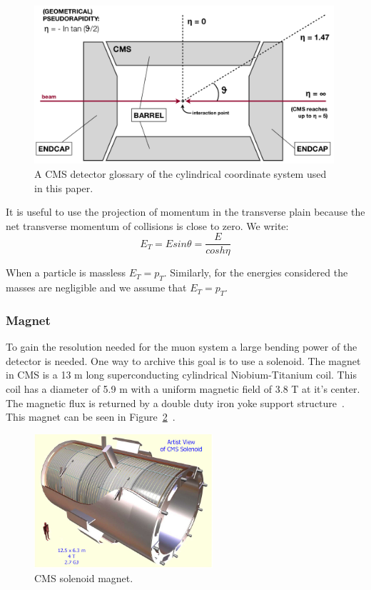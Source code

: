 \begin{figure}[htb]
\centering
\includegraphics[width=0.99\textwidth]{Experiment/DetectorGlossary.png}
\caption{A CMS detector glossary of the cylindrical coordinate system used in this paper.~\cite{Pandolfi_talk}}
\label{fig:CMS_detector_glossary}
\end{figure}

It is useful to use the projection of momentum in the transverse plain because the net transverse momentum of collisions is close to zero.  We write:
\begin{equation} E_T = E sin \theta = \dfrac{E}{cosh\eta} \label{eq:transverse_energy}\end{equation}

When a particle is massless $E_T=p_T$.  Similarly, for the energies considered the masses are negligible and we assume that $E_T=p_T$.

\subsubsection{Magnet}

To gain the resolution needed for the muon system a large bending power of the detector is needed.  One way to archive this goal is to use a solenoid.  The magnet in CMS is a 13 m long superconducting cylindrical Niobium-Titanium coil.  This coil has a diameter of 5.9 m with a uniform magnetic field of 3.8 T at it's center.  The magnetic flux is returned by a double duty iron yoke support structure~\cite{Magnet_CMS}. This magnet can be seen in Figure~\ref{fig:CMS_solenoid_magnet}~\cite{cms_solenoid_magnet}.

\begin{figure}[htb]
\centering
\includegraphics[width=0.59\textwidth]{Experiment/CMS-solenoid-magnet.jpg}
\caption{CMS solenoid magnet.~\cite{cms_solenoid_magnet}}
\label{fig:CMS_solenoid_magnet}
\end{figure}



